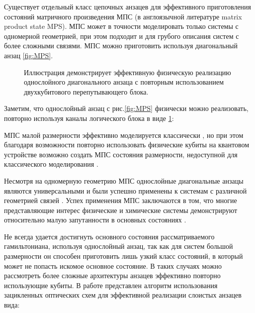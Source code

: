 \documentclass[14pt]{extarticle}
\begin{document}
\qquad Существует отдельный класс цепочных анзацев для эффективного приготовления состояний матричного произведения МПС (в англоязычной литературе matrix product state MPS).  МПС может в точности моделировать только системы с одномерной геометрией, при этом подходит и для грубого описания систем с более сложными связями. МПС можно приготовить используя диагональный анзац \ref{fig:MPS}.

\begin{figure}[H]
\caption{Иллюстрация демонстрирует эффективную физическую реализацию однослойного диагонального анзаца с повторным использованием двухкубитового перепутывающего блока.}\label{fig:MPS2}
\end{figure}

\qquad Заметим, что однослойный анзац с рис.\ref{fig:MPS} физически можно реализовать, повторно используя каналы логического блока в виде \ref{fig:MPS2}:

\qquad МПС малой размерности эффективно моделируется классически \cite{PhysRevLett.91.147902}, но при этом благодаря возможности повторно использовать физические кубиты на квантовом устройстве возможно создать МПС состояния размерности, недоступной для классического моделирования \cite{Liu_2019}.

\qquad Несмотря на одномерную геометрию МПС однослойные диагональные анзацы являются универсальными и были успешно применены к системам с различной геометрией связей \cite{doi:10.1146/annurev-conmatphys-020911-125018}. Успех применения МПС заключаются в том, что многие представляющие интерес физические и химические системы демонстрируют относительно малую запутанности в основных состояниях \cite{RevModPhys.82.277}.

\qquad Не всегда удается достигнуть основного состояния рассматриваемого гамильтониана, используя однослойный анзац, так как для систем большой размерности он способен приготовить лишь узкий класс состояний, в который может не попасть искомое основное состояние. В таких случаях можно рассмотреть более сложные архитектуры анзацев эффективно повторно использующие кубиты. В работе \cite{universal_linear_loop} представлен алгоритм использования зацикленных оптических схем для эффективной реализации слоистых анзацев вида:
\end{document}
